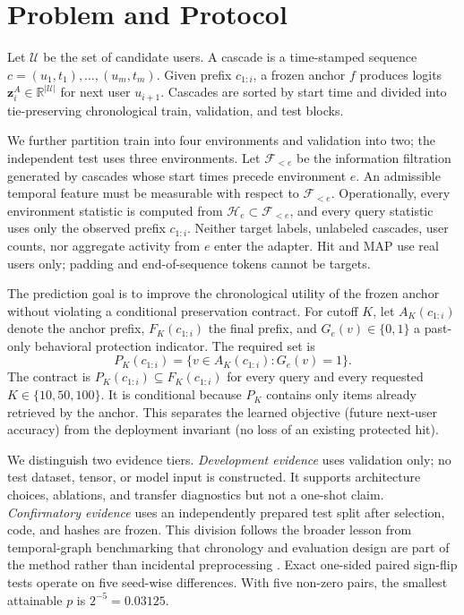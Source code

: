 \documentclass[sigconf,anonymous,review]{acmart}
\begin{document}
\section{Problem and Protocol}
Let $\mathcal{U}$ be the set of candidate users. A cascade is a time-stamped sequence $c=(u_1,t_1),\ldots,(u_m,t_m)$. Given prefix $c_{1:i}$, a frozen anchor $f$ produces logits $\mathbf{z}^{A}_{i}\in\mathbb{R}^{|\mathcal U|}$ for next user $u_{i+1}$. Cascades are sorted by start time and divided into tie-preserving chronological train, validation, and test blocks.

We further partition train into four environments and validation into two; the independent test uses three environments. Let $\mathcal F_{<e}$ be the information filtration generated by cascades whose start times precede environment $e$. An admissible temporal feature must be measurable with respect to $\mathcal F_{<e}$. Operationally, every environment statistic is computed from $\mathcal H_e\subset\mathcal F_{<e}$, and every query statistic uses only the observed prefix $c_{1:i}$. Neither target labels, unlabeled cascades, user counts, nor aggregate activity from $e$ enter the adapter. Hit and MAP use real users only; padding and end-of-sequence tokens cannot be targets.

The prediction goal is to improve the chronological utility of the frozen anchor without violating a conditional preservation contract. For cutoff $K$, let $A_K(c_{1:i})$ denote the anchor prefix, $F_K(c_{1:i})$ the final prefix, and $G_e(v)\in\{0,1\}$ a past-only behavioral protection indicator. The required set is
\begin{equation}
P_K(c_{1:i})=\{v\in A_K(c_{1:i}):G_e(v)=1\}.
\end{equation}
The contract is $P_K(c_{1:i})\subseteq F_K(c_{1:i})$ for every query and every requested $K\in\{10,50,100\}$. It is conditional because $P_K$ contains only items already retrieved by the anchor. This separates the learned objective (future next-user accuracy) from the deployment invariant (no loss of an existing protected hit).

We distinguish two evidence tiers. \emph{Development evidence} uses validation only; no test dataset, tensor, or model input is constructed. It supports architecture choices, ablations, and transfer diagnostics but not a one-shot claim. \emph{Confirmatory evidence} uses an independently prepared test split after selection, code, and hashes are frozen. This division follows the broader lesson from temporal-graph benchmarking that chronology and evaluation design are part of the method rather than incidental preprocessing \cite{poursafaei2022better,huang2023tgb}. Exact one-sided paired sign-flip tests operate on five seed-wise differences. With five non-zero pairs, the smallest attainable $p$ is $2^{-5}=0.03125$.
\end{document}

